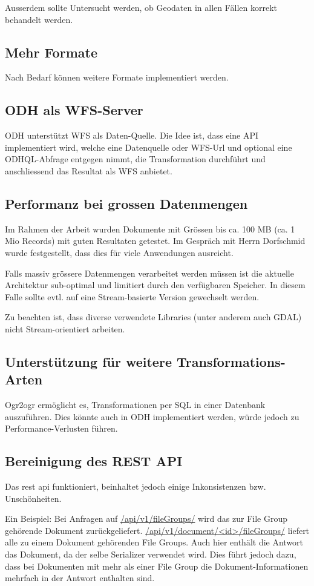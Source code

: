 Ausserdem sollte Untersucht werden, ob Geodaten in allen Fällen korrekt behandelt werden.

\subsection{Mehr Formate}
Nach Bedarf können weitere Formate implementiert werden.

\subsection{ODH als WFS-Server}
ODH unterstützt WFS als Daten-Quelle. Die Idee ist, dass eine API implementiert wird, welche eine Datenquelle oder WFS-Url und optional eine ODHQL-Abfrage entgegen nimmt, die Transformation durchführt und anschliessend das Resultat als WFS anbietet.

\subsection{Performanz bei grossen Datenmengen}
Im Rahmen der Arbeit wurden Dokumente mit Grössen bis ca. 100 MB (ca. 1 Mio Records) mit guten Resultaten getestet. Im Gespräch mit Herrn Dorfschmid wurde festgestellt, dass dies für viele Anwendungen ausreicht.

Falls massiv grössere Datenmengen verarbeitet werden müssen ist die aktuelle Architektur sub-optimal und limitiert durch den verfügbaren Speicher. In diesem Falle sollte evtl. auf eine Stream-basierte Version gewechselt werden.

Zu beachten ist, dass diverse verwendete Libraries (unter anderem auch GDAL) nicht Stream-orientiert arbeiten.

\subsection{Unterstützung für weitere Transformations-Arten}
Ogr2ogr ermöglicht es, Transformationen per SQL in einer Datenbank auszuführen. Dies könnte auch in ODH implementiert werden, würde jedoch zu Performance-Verlusten führen.

\subsection{Bereinigung des REST API}
Das \gls{rest} \acs{api} funktioniert, beinhaltet jedoch einige Inkonsistenzen bzw. Unschönheiten. 

Ein Beispiel:
Bei Anfragen auf \url{/api/v1/fileGroups/} wird das zur File Group gehörende Dokument zurückgeliefert.
\url{/api/v1/document/<id>/fileGroups/} liefert alle zu einem Dokument gehörenden File Groups. Auch hier enthält die Antwort das Dokument, da der selbe Serializer verwendet wird. Dies führt jedoch dazu, dass bei Dokumenten mit mehr als einer File Group die Dokument-Informationen mehrfach in der Antwort enthalten sind.

